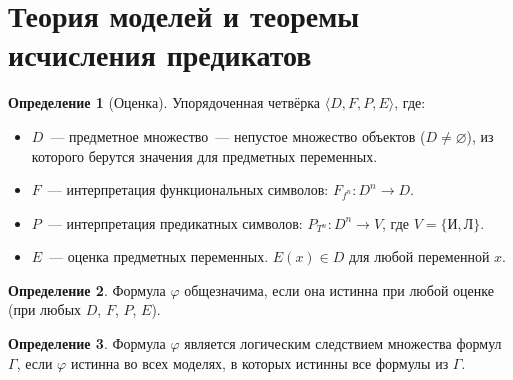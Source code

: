 \documentclass[a4paper,11pt]{article}
\theoremstyle{definition}
\newtheorem*{dfn}{Определение}
\newcommand{\True}{\text{И}}
\newcommand{\False}{\text{Л}}
\begin{document}
\section{Теория моделей и теоремы исчисления предикатов}
\begin{dfn}[Оценка]
Упорядоченная четвёрка $\langle D, F, P, E\rangle$, где:
\begin{itemize}
\item $D$~--- предметное множество~--- непустое множество объектов ($D \ne
  \varnothing$), из которого берутся значения для предметных переменных.
\item $F$~--- интерпретация функциональных символов: $F_{f^n} : D^n \to D$.
\item $P$~--- интерпретация предикатных символов: $P_{T^n} : D^n \to V$, где $V
  = \{\True, \False\}$.
\item $E$~--- оценка предметных переменных. $E(x) \in D$ для любой переменной
  $x$.
\end{itemize}
\end{dfn}
\begin{dfn}
Формула $\varphi$ общезначима, если она истинна при любой оценке (при любых $D$,
$F$, $P$, $E$).
\end{dfn}
\begin{dfn}
Формула $\varphi$ является логическим следствием множества формул $\Gamma$, если
$\varphi$ истинна во всех моделях, в которых истинны все формулы из $\Gamma$.
\end{dfn}
\end{document}
